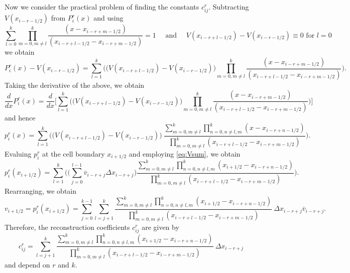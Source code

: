 \documentclass{article}
\newcommand{\dd}[2]{\frac{d #1}{d #2}}
\newcommand{\xri}[0]{x_{i+1/2}}
\newcommand{\vri}[0]{v_{i+1/2}}
\numberwithin{equation}{section}
\begin{document}
Now we consider the practical problem of finding the constants
$c^r_{ij}$.  Subtracting $V(x_{i-r-1/2})$ from $P^r_i(x)$ and using
\begin{equation*}
  \sum_{l=0}^{k} \prod_{m=0, m \neq l}^{k}
    \frac{(x - x_{i-r+m-1/2})}{(x_{i-r+l-1/2} - x_{i-r+m-1/2})} = 1
  \quad \text{ and } \quad
  V(x_{i-r+l-1/2}) - V(x_{i-r-1/2}) \equiv 0 \text{ for } l = 0
\end{equation*}
we obtain
\begin{equation*}
  P^r_i(x) - V(x_{i-r-1/2}) = \sum_{l=1}^{k} \Biggl(
    \bigl( V(x_{i-r+l-1/2}) - V(x_{i-r-1/2}) \bigr)
    \prod_{m=0, m \neq l}^{k}
      \frac{(x - x_{i-r+m-1/2})}{(x_{i-r+l-1/2} - x_{i-r+m-1/2})}
      \Biggr).
\end{equation*}
Taking the derivative of the above, we obtain
\begin{equation*}
  \dd{}{x}P^r_i(x) = \dd{}{x} \Biggl[ \sum_{l=1}^{k} \Biggl(
    \bigl( V(x_{i-r+l-1/2}) - V(x_{i-r-1/2}) \bigr) \prod_{m=0, m \neq l}^{k}
      \frac{(x - x_{i-r+m-1/2})}{(x_{i-r+l-1/2} - x_{i-r+m-1/2})}
      \Biggr) \Biggr]
\end{equation*}
and hence
\begin{equation}
  p^r_i(x) = \sum_{l=1}^{k} \Biggl(
  \bigl( V(x_{i-r+l-1/2}) - V(x_{i-r-1/2}) \bigr) \
    \frac{\sum_{m=0, m \neq l}^{k} \prod_{n=0, n \neq l,m}^{k}
      (x - x_{i-r+n-1/2})}{\prod_{m=0, m \neq l}^{k}
      (x_{i-r+l-1/2} - x_{i-r+m-1/2})} \Biggr). \label{eq:pV}
\end{equation}
Evaluing $p^r_i$ at the cell boundary $\xri$ and employing
\eqref{eq:Vsum}, we obtain
\begin{equation}
  p^r_i(\xri) = \sum_{l=1}^{k} \Biggl(
    \biggl( \sum_{j=0}^{l-1} \overline{v}_{i-r+j} \Delta x_{i-r+j} \biggr)
    \frac{\sum_{m=0, m \neq l}^{k} \prod_{n=0, n \neq l,m}^{k}
      (\xri - x_{i-r+n-1/2})}{\prod_{m=0, m \neq l}^{k}
      (x_{i-r+l-1/2} - x_{i-r+m-1/2})} \Biggr).
\end{equation}
Rearranging, we obtain
\begin{equation*}
  \vri = p^r_i(\xri) = \sum_{j=0}^{k-1} \sum_{l=j+1}^k
    \frac{\sum_{m=0, m \neq l}^{k} \prod_{n=0, n \neq l,m}^{k}
      (\xri - x_{i-r+n-1/2})}{\prod_{m=0, m \neq l}^{k}
      (x_{i-r+l-1/2} - x_{i-r+m-1/2})} \ \Delta x_{i-r+j} \overline{v}_{i-r+j}.
\end{equation*}
Therefore, the reconstruction coefficients $c^r_{ij}$ are given by
\begin{equation}
  c^r_{ij} = \sum_{l=j+1}^k \frac{\sum_{m=0, m \neq l}^{k}
    \prod_{n=0, n \neq l,m}^{k} (\xri - x_{i-r+n-1/2})}{
    \prod_{m=0, m \neq l}^{k} (x_{i-r+l-1/2} - x_{i-r+m-1/2})}
    \ \Delta x_{i-r+j}
\end{equation}
and depend on $r$ and $k$.
\end{document}
